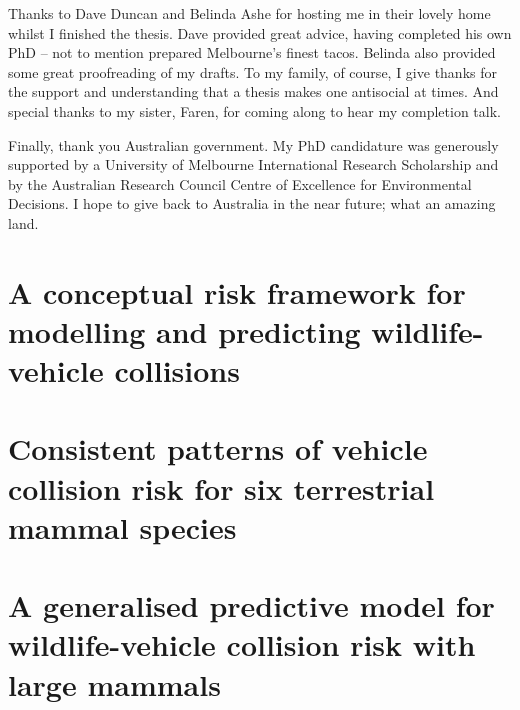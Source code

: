 \documentclass[titlesmallcaps,copyrightpage,examinerscopy]{uomthesis}
\begin{document}
Thanks to Dave Duncan and Belinda Ashe for hosting me in their lovely home whilst I finished the thesis. Dave provided great advice, having completed his own PhD -- not to mention prepared Melbourne's finest tacos. Belinda also provided some great proofreading of my drafts. To my family, of course, I give thanks for the support and understanding that a thesis makes one antisocial at times. And special thanks to my sister, Faren, for coming along to hear my completion talk.

Finally, thank you Australian government. My PhD candidature was generously supported by a University of Melbourne International Research Scholarship and by the Australian Research Council Centre of Excellence for Environmental Decisions. I hope to give back to Australia in the near future; what an amazing land.
\clearpage{\pagestyle{empty}\cleardoublepage}

\tableofcontents
\clearpage{\pagestyle{empty}\cleardoublepage}

\listoffigures
\clearpage{\pagestyle{empty}\cleardoublepage}

\listoftables
\clearpage{\pagestyle{empty}\cleardoublepage}

\mainmatter


\clearpage{\pagestyle{empty}\cleardoublepage}

%
\chapter{A conceptual risk framework for modelling and predicting wildlife-vehicle collisions}\label{sec:egk}
\clearpage{\pagestyle{empty}\cleardoublepage}

%
\chapter{Consistent patterns of vehicle collision risk for six terrestrial mammal species}\label{sec:6sp}
\clearpage{\pagestyle{empty}\cleardoublepage}

%
\chapter{A generalised predictive model for wildlife-vehicle collision risk with large mammals}\label{sec:cal}
\clearpage{\pagestyle{empty}\cleardoublepage}
\end{document}
